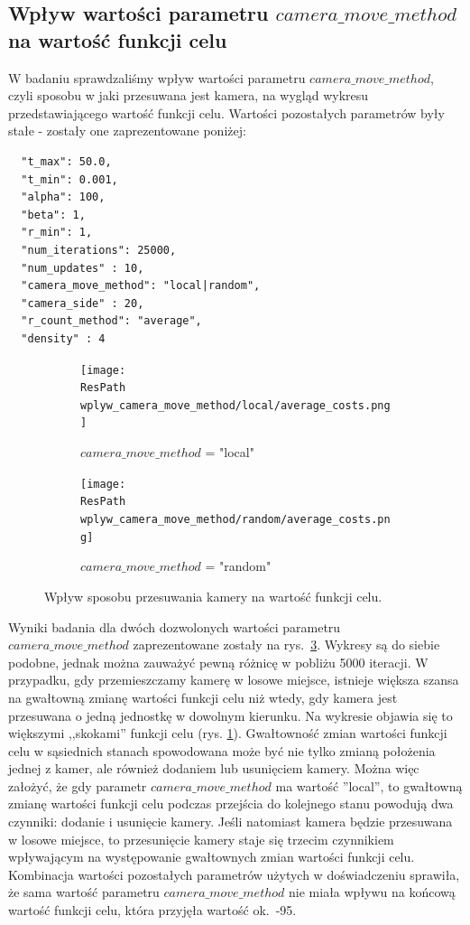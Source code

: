 \documentclass[12pt,a4paper]{article}
\newcommand{\ResPath}{../badania/}
\begin{document}
\subsection{Wpływ wartości parametru $camera\_move\_method$ na wartość funkcji celu}
W badaniu sprawdzaliśmy wpływ wartości parametru $camera\_move\_method$,
czyli sposobu w jaki przesuwana jest kamera, na wygląd wykresu przedstawiającego wartość funkcji celu.
Wartości pozostałych parametrów były stałe - zostały one zaprezentowane poniżej:

\begin{lstlisting}
  "t_max": 50.0,
  "t_min": 0.001,
  "alpha": 100,
  "beta": 1,
  "r_min": 1,
  "num_iterations": 25000,
  "num_updates" : 10,
  "camera_move_method": "local|random",
  "camera_side" : 20,
  "r_count_method": "average",
  "density" : 4
\end{lstlisting}
\begin{figure}[htb]
  \begin{subfigure}[b]{0.5\linewidth}
    \centering
    \texttt{[image: \\ResPath wplyw\_camera\_move\_method/local/average\_costs.png]}
    \caption{$camera\_move\_method$ = "local"}
    \label{fig_cam_move_method:a}
  \end{subfigure}%
  \begin{subfigure}[b]{0.5\linewidth}
    \texttt{[image: \\ResPath wplyw\_camera\_move\_method/random/average\_costs.png]}
    \caption{$camera\_move\_method$ = "random"}
    \label{fig_cam_move_method:b}
  \end{subfigure}
  \caption{Wpływ sposobu przesuwania kamery na wartość funkcji celu.}
  \label{fig_cam_move_method}
\end{figure}
Wyniki badania dla dwóch dozwolonych wartości parametru $camera\_move\_method$
zaprezentowane zostały na rys.\ \ref{fig_cam_move_method}. Wykresy są do siebie
podobne, jednak można zauważyć pewną różnicę w pobliżu 5000 iteracji.
W przypadku, gdy przemieszczamy kamerę w losowe miejsce, istnieje większa
szansa na gwałtowną zmianę wartości funkcji celu niż wtedy, gdy kamera jest
przesuwana o jedną jednostkę w dowolnym kierunku. Na wykresie objawia się
to większymi ,,skokami'' funkcji celu (rys. \ref{fig_cam_move_method:a}).
Gwałtowność zmian wartości funkcji celu
w sąsiednich stanach spowodowana może być nie tylko zmianą położenia jednej z kamer,
ale również dodaniem lub usunięciem kamery. Można więc założyć, że gdy
parametr $camera\_move\_method$ ma wartość ''local'', to gwałtowną zmianę
wartości funkcji celu podczas przejścia do kolejnego stanu powodują
dwa czynniki: dodanie i usunięcie
kamery. Jeśli natomiast kamera będzie przesuwana w losowe miejsce, to
przesunięcie kamery staje się trzecim czynnikiem wpływającym na występowanie
gwałtownych zmian wartości funkcji celu. Kombinacja wartości pozostałych
parametrów użytych w doświadczeniu sprawiła, że sama wartość parametru
$camera\_move\_method$ nie miała wpływu na końcową wartość funkcji celu,
która przyjęła wartość ok.\ -95.
\end{document}
